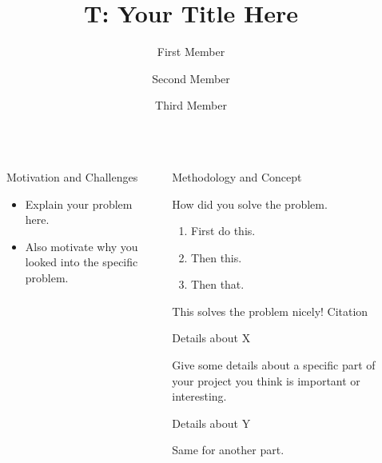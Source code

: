 \documentclass[final,dvipsnames]{beamer}
\title{T: Your Title Here}
\author{First Member \inst{1} \and Second Member \inst{1} \and Third Member \inst{1}}
\institute[shortinst]{\inst{1} Heidelberg University}
\newlength{\sepwidth}
\newlength{\colwidth}
\newcommand{\separatorcolumn}{\begin{column}{\sepwidth}\end{column}}
\begin{document}
\begin{frame}[t, fragile]
\begin{columns}[t]
\separatorcolumn

\begin{column}{\colwidth}

	\begin{block}{Motivation and Challenges}

		\begin{itemize}
			\item Explain your problem here. 
			\item Also motivate why you looked into the specific problem.
		\end{itemize}

	\end{block}


\end{column}

\separatorcolumn

\begin{column}{\colwidth}

	\begin{alertblock}{Methodology and Concept}

		How did you solve the problem.

		\begin{enumerate}
				\item First do this.
				\item Then this.
				\item Then that.
		\end{enumerate}

		This solves the problem nicely! Citation\cite{goli_resprop_2020}

	\end{alertblock}

	\begin{block}{Details about X}

		Give some details about a specific part of your project you think is
		important or interesting.

	\end{block}

	\begin{block}{Details about Y}

		Same for another part.

	\end{block}

\end{column}

\separatorcolumn


\end{columns}
\end{frame}
\end{document}
